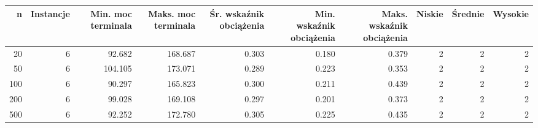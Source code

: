 \begin{tabular}{rrrrrrrrrr}
\toprule
n & Instancje & Min. moc terminala & Maks. moc terminala & Śr. wskaźnik obciążenia & Min. wskaźnik obciążenia & Maks. wskaźnik obciążenia & Niskie & Średnie & Wysokie \\
\midrule
20 & 6 & 92.682 & 168.687 & 0.303 & 0.180 & 0.379 & 2 & 2 & 2 \\
50 & 6 & 104.105 & 173.071 & 0.289 & 0.223 & 0.353 & 2 & 2 & 2 \\
100 & 6 & 90.297 & 165.823 & 0.300 & 0.211 & 0.439 & 2 & 2 & 2 \\
200 & 6 & 99.028 & 169.108 & 0.297 & 0.201 & 0.373 & 2 & 2 & 2 \\
500 & 6 & 92.252 & 172.780 & 0.305 & 0.225 & 0.435 & 2 & 2 & 2 \\
\bottomrule
\end{tabular}
